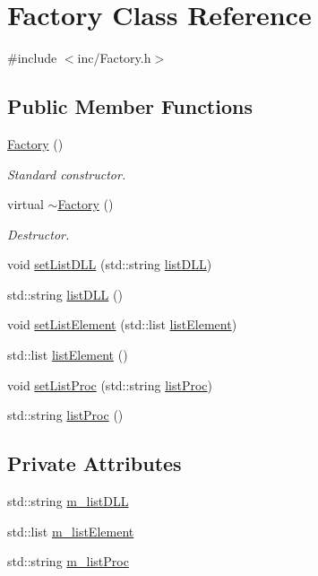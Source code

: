 \hypertarget{classFactory}{}\section{Factory Class Reference}
\label{classFactory}


{\ttfamily \#include $<$inc/\+Factory.\+h$>$}

\subsection*{Public Member Functions}
\begin{DoxyCompactItemize}
\item 
\hyperlink{classFactory_ac792bf88cfb7b6804b479529da5308cc}{Factory} ()
\begin{DoxyCompactList}\small\item\em Standard constructor. \end{DoxyCompactList}\item 
virtual \hyperlink{classFactory_abb3d73c23bef3ca95487856ef0d7c476}{$\sim$\+Factory} ()
\begin{DoxyCompactList}\small\item\em Destructor. \end{DoxyCompactList}\item 
void \hyperlink{classFactory_a0f10adde2d57c8a1d07fdb4557f3ac3b}{set\+List\+D\+LL} (std\+::string \hyperlink{classFactory_a21cd37e4b21b06e574cf67faea08782a}{list\+D\+LL})
\item 
std\+::string \hyperlink{classFactory_a21cd37e4b21b06e574cf67faea08782a}{list\+D\+LL} ()
\item 
void \hyperlink{classFactory_a7bc368f81d0228931a44b41b27c39b53}{set\+List\+Element} (std\+::list \hyperlink{classFactory_aca9a1442c4ee2f17ea27db723ce65d90}{list\+Element})
\item 
std\+::list \hyperlink{classFactory_aca9a1442c4ee2f17ea27db723ce65d90}{list\+Element} ()
\item 
void \hyperlink{classFactory_afdec7fe6e79da3e5748d33f740333671}{set\+List\+Proc} (std\+::string \hyperlink{classFactory_afb222fc976d624fa6fdcb30f0aca586c}{list\+Proc})
\item 
std\+::string \hyperlink{classFactory_afb222fc976d624fa6fdcb30f0aca586c}{list\+Proc} ()
\end{DoxyCompactItemize}
\subsection*{Private Attributes}
\begin{DoxyCompactItemize}
\item 
std\+::string \hyperlink{classFactory_a266167ae49fcf4fa9baa5485dea4b062}{m\+\_\+list\+D\+LL}
\item 
std\+::list \hyperlink{classFactory_a83a99d80105fab2371ce03230b90e8a3}{m\+\_\+list\+Element}
\item 
std\+::string \hyperlink{classFactory_aec20c1d0a1ef175f55a82e868edabe88}{m\+\_\+list\+Proc}
\end{DoxyCompactItemize}


